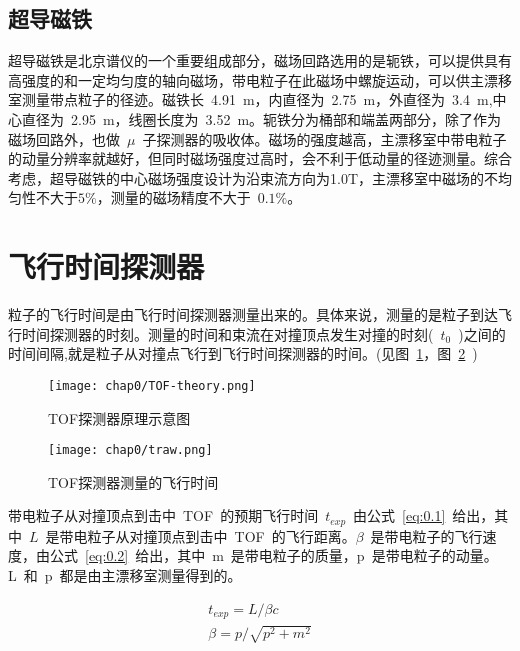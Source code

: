 \subsection{超导磁铁}

超导磁铁是北京谱仪的一个重要组成部分，磁场回路选用的是轭铁，可以提供具有高强度的和一定均匀度的轴向磁场，带电粒子在此磁场中螺旋运动，可以供主漂移室测量带点粒子的径迹。磁铁长~4.91~m，内直径为~2.75~m，外直径为~3.4~m,中心直径为~2.95~m，线圈长度为~3.52~m。轭铁分为桶部和端盖两部分，除了作为磁场回路外，也做~$\mu$~子探测器的吸收体。磁场的强度越高，主漂移室中带电粒子的动量分辨率就越好，但同时磁场强度过高时，会不利于低动量的径迹测量。综合考虑，超导磁铁的中心磁场强度设计为沿束流方向为1.0T，主漂移室中磁场的不均匀性不大于$5\%$，测量的磁场精度不大于~$0.1\%$。

\section{飞行时间探测器}

粒子的飞行时间是由飞行时间探测器测量出来的。具体来说，测量的是粒子到达飞行时间探测器的时刻。测量的时间和束流在对撞顶点发生对撞的时刻(~$t_{0}$~)之间的时间间隔,就是粒子从对撞点飞行到飞行时间探测器的时间。(见图~\ref{fig:TOF-theory}，图~\ref{fig:traw}~)

\begin{figure}[!h]
  \centering
  \texttt{[image: chap0/TOF-theory.png]}
  \caption{TOF探测器原理示意图}
  \label{fig:TOF-theory}
\end{figure}

\begin{figure}[!h]
  \centering
  \texttt{[image: chap0/traw.png]}
  \caption{TOF探测器测量的飞行时间}
  \label{fig:traw}
\end{figure}

带电粒子从对撞顶点到击中~TOF~的预期飞行时间~$t_{exp}$~由公式~\ref{eq:0.1}~给出，其中~$L$~是带电粒子从对撞顶点到击中~TOF~的飞行距离。$\beta$~是带电粒子的飞行速度，由公式~\ref{eq:0.2}~给出，其中~m~是带电粒子的质量，p~是带电粒子的动量。L~和~p~都是由主漂移室测量得到的。

\begin{align}
t_{exp}=L/\beta c 
\label{eq:0.1}\\
\beta=p/\sqrt {p^{2}+m^{2}}
\label{eq:0.2}
\end{align}

